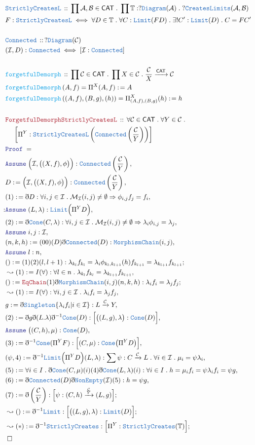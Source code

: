 \documentclass[12pt]{scrartcl}
\newcommand{\TYPE}[1]{\textcolor{NavyBlue}{\mathtt{#1}}}
\newcommand{\FUNC}[1]{\textcolor{Cerulean}{\mathtt{#1}}}
\newcommand{\LOGIC}[1]{\textcolor{Blue}{\mathtt{#1}}}
\newcommand{\THM}[1]{\textcolor{Maroon}{\mathtt{#1}}}
\renewcommand{\.}{\; . \;}
\newcommand{\de}{: \kern 0.1pc =}
\newcommand{\Act}[1]{\left( #1 \right)}
\newcommand{\Theorem}[2]{& \THM{#1} \, :: \, #2 \\ & \Proof = \\ }
\newcommand{\DeclareType}[2]{& \TYPE{#1} \, :: \, #2 \\}
\newcommand{\DefineType}[3]{& #1 : \TYPE{#2} \iff #3 \\}
\newcommand{\DeclareFunc}[2]{& \FUNC{#1} \, :: \, #2 \\}
\newcommand{\DefineNamedFunc}[4]{&  \FUNC{#1}\Act{#2} = #3 \de #4 \\}
\newcommand{\NewLine}{\\ & \kern 1pc}
\newcommand{\Page}[1]{ \begin{align*} #1 \end{align*}   }
\newcommand{ \bd }{ \ByDef }
\newcommand{\Mor}{\mathcal{M}}
\newcommand{\Arrow}{\xrightarrow}
\newcommand{\Say}[3]{& #1 \de #2 : #3, \\}
\newcommand{\Conclude}[3]{& #1 \de #2 : #3; \\}
\newcommand{\Derive}[3]{& \leadsto #1 \de #2 : #3, \\}
\newcommand{\DeriveConclude}[3]{& \leadsto #1 \de #2 : #3 ; \\}
\newcommand{\Assume}[2]{& \LOGIC{Assume} \; #1 : #2, \\}
\newcommand{\QED}{\; \square}
\newcommand{\EndProof}{& \QED \\}
\newcommand{\ByDef}{\eth}
\newcommand{\Proof}{\LOGIC{Proof} \; }
\newcommand{\C}{\mathcal{C}}
\newcommand{\A}{\mathcal{A}}
\newcommand{\B}{\mathcal{B}}
\newcommand{\I}{\mathcal{I}}
\newcommand{\CAT}{\mathsf{CAT}}
\begin{document}
\Page{
	\DeclareType{StrictlyCreatesL}{\prod \A,\B \in \CAT \. \prod \mathbb{T} : ?\TYPE{Diagram}(\A) \.  
		?\TYPE{CreatesLimits}(\A,\B)}
	\DefineType{F}{StrictlyCreatesL}{ \forall D \in \mathbb{T} \. \forall  C : \TYPE{Limit}(FD) \. 
		\exists! C' : \TYPE{Limit}(D) \. C = FC'    }
	\\
	\DeclareType{Connected}{?\TYPE{Diagram}(\C)}
	\DefineType{(\I,D)}{Connected}{[\I : \TYPE{Connected}]}
	\\
	\DeclareFunc{forgetfulDemorph}{  \prod \C \in \CAT \. \prod X \in \C \. \frac{\C}{X} \Arrow{\CAT} \C   }
	\DefineNamedFunc{forgetfulDemorph}{A,f}{\Pi^X (A,f) }{A}
	\DefineNamedFunc{forgetfulDemorph}{ (A,f),(B,g),(h)}{\Pi_{(A,f),(B,g)}^X (h)}{h}
	\\
	\Theorem{ForgetfulDemorphStrictlyCreatesL}{ 
		\forall \C \in \CAT \. 
		\forall Y \in \C \. \NewLine 
		\left[\Pi^Y : \TYPE{StrictlyCreatesL}\left(\TYPE{Connected}\left( \frac{\C}{Y}\right)\right) \right]          
	}
	\Assume{\Big(\I,\big((X,f),\phi\big)\Big)}{  \TYPE{Connected}\left( \frac{\C}{Y}\right)  }
	\Say{D}{\Big(\I,\big((X,f),\phi\big)\Big)}{ \TYPE{Connected}\left( \frac{\C}{Y}\right) }
	\Say{(1)}{\bd D}{ \forall i,j \in \I \. \Mor_\I(i,j) \neq \emptyset \Rightarrow \phi_{i,j} f_j = f_i }
	:\Assume{(L,\lambda)}{\TYPE{Limit}\Big(\Pi^Y D\Big)}
	\Say{(2)}{\bd \TYPE{Cone}(C,\lambda) }{ \forall i,j \in \I \. 
		\Mor_{\I}(i,j) \neq \emptyset \Rightarrow  \lambda_i \phi_{i,j} = \lambda_j }
	\Assume{ i,j}{  \I }
	\Say{(n,k,h)}{(00)(D)\bd \TYPE{Connected}(D)}{\TYPE{MorphismChain}(i,j)}
	\Assume{l}{n}
	\Conclude{()}{(1)(2)(l,l+1)}{ \lambda_{k_l} f_{k_l} = \lambda_i \phi_{k_l,k_{l+1} }(h) f_{k_{l+1}} 
		= \lambda_{k_{l+1}} f_{k_{l+1}} }
	\Derive{(1)}{I(\forall)}{ \forall l \in n \. \lambda_{k_l} f_{k_l} = \lambda_{k_{l+1}}f_{k_{l+1}}}
	\Conclude{()}{\THM{EqChain}(1)\bd \TYPE{MorphismChain}(i,j)(n,k,h)}{\lambda_i f_i = \lambda_j f_j}
	\Derive{(1)}{I(\forall)}{\forall i,j \in \I \. \lambda_i f_i = \lambda_j f_j}
	\Say{g}{\bd \TYPE{Singleton} \{ \lambda_i f_i  | i \in \I  \}}{ L  \Arrow{\C} Y  }
	\Say{(2)}{\bd g \bd(L.\lambda)\bd^{-1} \TYPE{Cone}(D)}{\Big[ \big( (L,g),\lambda\big) : \TYPE{Cone}(D)  \Big]}
	\Assume{\big( (C,h),\mu)}{\TYPE{Cone}(D)}
	\Say{(3)}{\bd^{-1} \TYPE{Cone}(\Pi^Y F)}{ \Big[(C,\mu) : \TYPE{Cone}\big(\Pi^Y D\big)\Big]}
	\Say{(\psi,4)}{\bd^{-1} \TYPE{Limit}\Big(\Pi^Y D \Big)(L,\lambda) }
	{ \sum \psi : C \Arrow{\C} L \. \forall i \in \I \. \mu_i = \psi \lambda_i }
	\Say{(5)}{ \forall i \in I \. \bd \TYPE{Cone}(C,\mu)(i)(4)\bd \TYPE{Cone}(L,\lambda)(i)  }
	{ \forall i \in I \. h = \mu_i f_i = \psi \lambda_i f_i = \psi g }
	\Say{(6)}{\bd \TYPE{Connected}(D)\bd \TYPE{NonEmpty}(\I)(5)}{ h = \psi g  }
	\Conclude{(7)}{\bd \left( \frac{\C}{Y} \right)}{\Big[ \psi : (C,h) \Arrow{\frac{\C}{Y}} (L,g) \Big]}
	\DeriveConclude{()}{\bd^{-1} \TYPE{Limit}}{\Big[ \big((L,g),\lambda) : \TYPE{Limit}(D)  \Big]}
	\DeriveConclude{(*)}{\bd^{-1} \TYPE{StrictlyCreates}}{\Big[ \Pi^Y : \TYPE{StrictlyCreates}(\mathbb{T})\Big]}
	\EndProof
}
\end{document}

